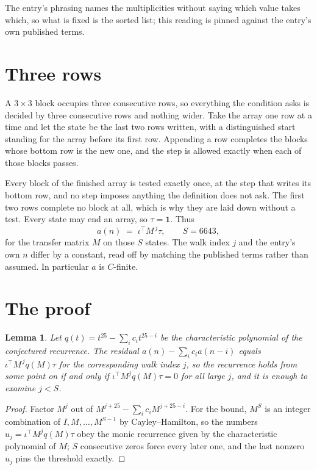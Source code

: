 \documentclass[11pt,a4paper]{article}
\theoremstyle{plain}
\newtheorem{lemma}[theorem]{Lemma}
\theoremstyle{definition}
\begin{document}
The entry's phrasing names the multiplicities without saying which value takes which, so what is fixed is the sorted list; this reading is pinned against the entry's own published terms.

\section{Three rows}

A $3\times3$ block occupies three consecutive rows, so everything the condition asks is decided
by three consecutive rows and nothing wider. Take the array one row at a time and let the state
be the last two rows written, with a distinguished start standing for the array before its
first row. Appending a row completes the blocks whose bottom row is the new one, and the step
is allowed exactly when each of those blocks passes.

Every block of the finished array is tested exactly once, at the step that writes its bottom
row, and no step imposes anything the definition does not ask. The first two rows complete no
block at all, which is why they are laid down without a test. Every state may end an array, so
$\tau=\mathbf{1}$. Thus
\[
a(n)\;=\;\iota^{\!\top}M^{\,j}\tau ,\qquad S=6643,
\]
for the transfer matrix $M$ on those $S$ states. The walk index $j$ and the entry's own $n$
differ by a constant, read off by matching the published terms rather than assumed. In
particular $a$ is $C$-finite.

\section{The proof}

\begin{lemma}\label{lem:crit}
Let $q(t)=t^{25}-\sum_i c_it^{25-i}$ be the characteristic polynomial of the
conjectured recurrence. The residual $a(n)-\sum_ic_ia(n-i)$ equals
$\iota^{\!\top}M^{\,j}q(M)\tau$ for the corresponding walk index $j$, so the recurrence
holds from some point on if and only if $\iota^{\!\top}M^{j}q(M)\tau=0$ for all large $j$,
and it is enough to examine $j<S$.
\end{lemma}

\begin{proof}
Factor $M^{j}$ out of $M^{j+25}-\sum_ic_iM^{j+25-i}$. For the bound, $M^{S}$
is an integer combination of $I,M,\dots,M^{S-1}$ by Cayley--Hamilton, so the numbers
$u_j=\iota^{\!\top}M^{j}q(M)\tau$ obey the monic recurrence given by the characteristic
polynomial of $M$; $S$ consecutive zeros force every later one, and the last nonzero $u_j$
pins the threshold exactly.
\end{proof}
\end{document}
